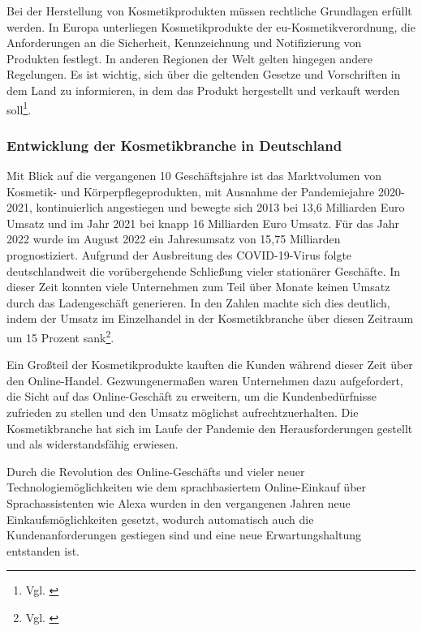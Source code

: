 Bei der Herstellung von Kosmetikprodukten müssen rechtliche Grundlagen erfüllt werden. In Europa unterliegen Kosmetikprodukte der \ac{eu}-Kosmetikverordnung, die Anforderungen an die Sicherheit, Kennzeichnung und Notifizierung von Produkten festlegt. In anderen Regionen der Welt gelten hingegen andere Regelungen. Es ist wichtig, sich über die geltenden Gesetze und Vorschriften in dem Land zu informieren, in dem das Produkt hergestellt und verkauft werden soll\footnote{Vgl. \autocite [online] {Haendlerbund2013}}.

\subsubsection{Entwicklung der Kosmetikbranche in Deutschland}\label{unterabschnitt_2_5_1}
Mit Blick auf die vergangenen 10 Geschäftsjahre ist das Marktvolumen von Kosmetik- und Körperpflegeprodukten, mit Ausnahme der Pandemiejahre 2020-2021, kontinuierlich angestiegen und bewegte sich 2013 bei 13,6 Milliarden Euro Umsatz und im Jahr 2021 bei knapp 16 Milliarden Euro Umsatz. Für das Jahr 2022 wurde im August 2022 ein Jahresumsatz von 15,75 Milliarden prognostiziert. Aufgrund der Ausbreitung des COVID-19-Virus folgte deutschlandweit die vorübergehende Schließung vieler stationärer Geschäfte. In dieser Zeit konnten viele Unternehmen zum Teil über Monate keinen Umsatz durch das Ladengeschäft generieren. In den Zahlen machte sich dies deutlich, indem der Umsatz im Einzelhandel in der Kosmetikbranche über diesen Zeitraum um 15 Prozent sank\footnote{Vgl. \autocite [Online] {statista2022}}.
\newline

Ein Großteil der Kosmetikprodukte kauften die Kunden während dieser Zeit über den Online-Handel.
\newline
Gezwungenermaßen waren Unternehmen dazu aufgefordert, die Sicht auf das Online-Geschäft zu erweitern, um die Kundenbedürfnisse zufrieden zu stellen und den Umsatz möglichst aufrechtzuerhalten.
\newline
Die Kosmetikbranche hat sich im Laufe der Pandemie den Herausforderungen gestellt und als widerstandsfähig erwiesen.
\newline

Durch die Revolution des Online-Geschäfts und vieler neuer Technologiemöglichkeiten wie dem sprachbasiertem Online-Einkauf über Sprachassistenten wie Alexa wurden in den vergangenen Jahren neue Einkaufsmöglichkeiten gesetzt, wodurch automatisch auch die Kundenanforderungen gestiegen sind und eine neue Erwartungshaltung entstanden ist.
\newline

